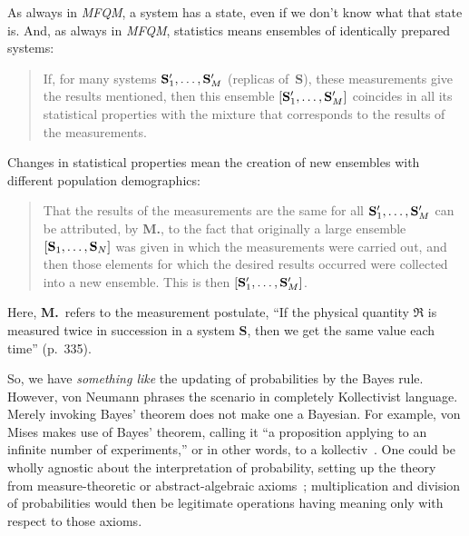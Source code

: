 \documentclass[aps,pra,superscriptaddress,12pt,tightenlines,nofootinbib]{revtex4-2}
\newcommand{\MFQM}{\textsl{MFQM}}
\begin{document}
As always in \MFQM, a system has a state, even if we don't know what
that state is.  And, as always in \MFQM, statistics means ensembles of
identically prepared systems:
\begin{quotation}
\noindent If, for many systems ${\bf S}'_1,\ldots,{\bf S}'_M$
(replicas of~{\bf S}), these measurements give the results mentioned,
then this ensemble $[{\bf S}'_1,\ldots,{\bf S}'_M]$ coincides in all
its statistical properties with the mixture that corresponds to the
results of the measurements.
\end{quotation}
Changes in statistical properties mean the creation of new ensembles
with different population demographics:
\begin{quotation}
That the results of the measurements are the same for all ${\bf
  S}'_1,\ldots,{\bf S}'_M$ can be attributed, by {\bf M.}, to the fact
that originally a large ensemble $[{\bf S}_1,\ldots,{\bf S}_N]$ was
given in which the measurements were carried out, and then those
elements for which the desired results occurred were collected into a
new ensemble.  This is then $[{\bf S}'_1,\ldots,{\bf S}'_M]$.
\end{quotation}
Here, {\bf M.}\ refers to the measurement postulate, ``If the physical
quantity $\mathfrak{R}$ is measured twice in succession in a system
{\bf S}, then we get the same value each time'' (p.\ 335).

So, we have \emph{something like} the updating of probabilities by the
Bayes rule.  However, von Neumann phrases the scenario in completely
Kollectivist language.  Merely invoking Bayes' theorem does not make
one a Bayesian.  For example, von Mises makes use of Bayes' theorem,
calling it ``a proposition applying to an infinite number of
experiments,'' or in other words, to a
kollectiv~\cite[p.\ 123]{Mises1957}.  One could be wholly agnostic
about the interpretation of probability, setting up the theory from
measure-theoretic or abstract-algebraic axioms~\cite{Tao2012};
multiplication and division of probabilities would then be legitimate
operations having meaning only with respect to those axioms.
\end{document}
